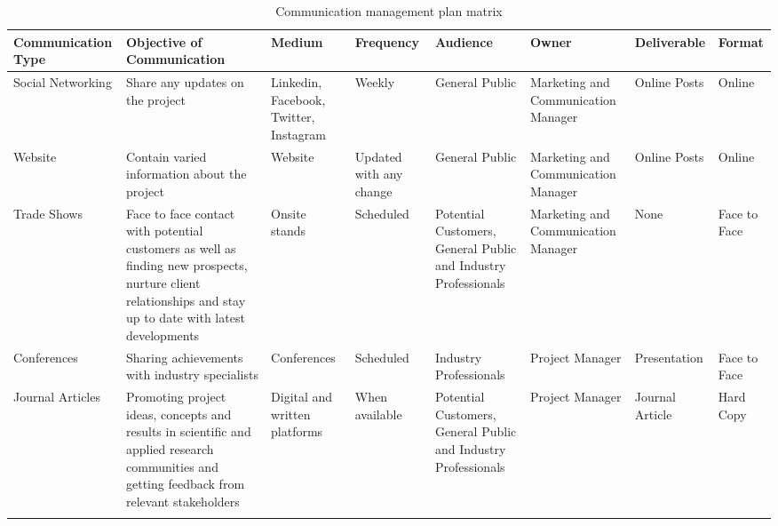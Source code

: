 \begin{landscape}
	
	
	\begin{longtable}{| >{\raggedright\arraybackslash}p{2.8cm}  | >{\raggedright\arraybackslash}p{2.8cm} | >{\raggedright\arraybackslash}p{2cm} | >{\raggedright\arraybackslash}p{2cm} | >{\raggedright\arraybackslash}p{2cm} | >{\raggedright\arraybackslash}p{2.4cm} | >{\raggedright\arraybackslash}p{2.4cm} | >{\raggedright\arraybackslash}p{2.4cm} |  }
		
		
		\toprule [2pt]
		
		\textbf{Communication Type} & \textbf{Objective of Communication} & \textbf{Medium}  &\textbf{Frequency} &\textbf{Audience}& \textbf{Owner}& \textbf{Deliverable} &\textbf{Format} \\  
		
		\midrule [1.5pt]
		\endhead
		
		Social Networking& Share any updates on the project  & Linkedin, Facebook, Twitter, Instagram   &Weekly   &General Public     &  Marketing and Communication Manager &Online Posts   &Online\\  
		
		\hline
		
		Website& Contain varied information about the project  &   Website &Updated with any change   &  General Public   &  Marketing and Communication Manager & Online Posts  &Online\\  
		
		\hline
		
		Trade Shows&Face to face contact with potential customers as well as finding new prospects, nurture client relationships and stay up to date with latest developments   &  Onsite stands  & Scheduled  &  Potential Customers, General Public and Industry Professionals   &Marketing and Communication Manager   & None  &Face to Face\\  
		
		\hline
		
		Conferences& Sharing achievements with industry specialists  &  Conferences  &Scheduled   & Industry Professionals    & Project Manager  & Presentation  &Face to Face\\  
		
		\hline
		
		Journal Articles&Promoting project ideas, concepts and results in scientific and applied research communities and getting feedback from relevant stakeholders   &Digital and written platforms    &  When available &  Potential Customers, General Public and Industry Professionals   & Project Manager  & Journal Article  &Hard Copy\\  
		
		\bottomrule[2pt]
		
		
		\caption{Communication management plan matrix}
	\end{longtable}
	
	\vspace*{\fill}
	
	
\end{landscape}
